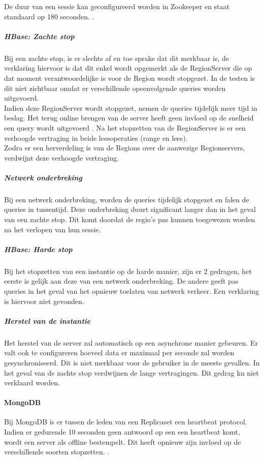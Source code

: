 De duur van een sessie kan geconfigureerd worden in Zookeeper en staat standaard op 180 seconden. \cite{hbase-doc}. 

\subparagraph{HBase: Zachte stop} Bij een zachte stop, is er slechts af en toe sprake dat dit merkbaar is, de verklaring hiervoor is dat dit enkel wordt opgemerkt als de RegionServer die op dat moment verantwoordelijke is voor de Region wordt stopgezet. In de testen is dit niet zichtbaar omdat er verschillende opeenvolgende queries worden uitgevoerd. \\
Indien deze RegionServer wordt stopgezet, nemen de queries tijdelijk meer tijd in beslag.  Het terug online brengen van de server heeft geen invloed op de snelheid een query wordt uitgevoerd . Na het stopzetten van de RegionServer is er een verhoogde vertraging in beide leesoperaties (range en lees). \\
Zodra er een herverdeling is van de Regions over de aanwezige Regionservers, verdwijnt deze verhoogde vertraging. 

\subparagraph{Netwerk onderbreking} Bij een netwerk onderbreking, worden de queries tijdelijk stopgezet en falen de queries in tussentijd. Deze onderbreking duurt significant langer dan in het geval van een zachte stop. Dit komt doordat de regio's pas kunnen toegewezen worden na het verlopen van hun sessie.  

\subparagraph{HBase: Harde stop} Bij het stopzetten van een instantie op de harde manier, zijn er 2 gedragen, het eerste is gelijk aan deze van een netwerk onderbreking. De andere geeft pas queries in het geval van het opnieuw toelaten van netwerk verkeer. Een verklaring is hiervoor niet gevonden. 

\subparagraph{Herstel van de instantie} Het herstel van de server zal automatisch op een asynchrone manier gebeuren. Er valt ook te configureren hoeveel data er maximaal per seconde zal worden gesynchroniseerd. Dit is niet merkbaar voor de gebruiker in de meeste gevallen. In het geval van de zachte stop verdwijnen de lange vertragingen. Dit gedrag kn niet verklaard worden. 

\paragraph{MongoDB} Bij MongoDB is er tussen de leden van een Replicaset een heartbeat protocol. Indien er gedurende 10 seconden geen antwoord op een een heartbeat komt, wordt een server als offline bestempelt. Dit heeft opnieuw zijn invloed op de verschillende soorten stopzetten. \cite{mongodb-manual}. 

